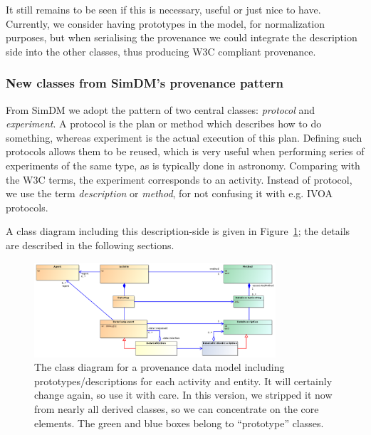 It still remains to be seen if this is necessary, useful or just nice to have. Currently, we consider having prototypes in the model, for normalization purposes, but when serialising the provenance we could integrate the description side into the other classes, thus producing W3C compliant provenance.



\subsubsection{New classes from SimDM's provenance pattern}
From SimDM we adopt the pattern of two central classes: \emph{protocol} and \emph{experiment}.  A protocol is the plan or method
which describes how to do something, whereas experiment is the actual execution of
this plan. Defining such protocols allows them to be reused, which is very useful when performing series of experiments of the same type, as is typically done in astronomy. Comparing with the W3C terms, the experiment corresponds to an activity. Instead of protocol, we use the term \emph{description} or \emph{method}, 
for not confusing it with e.g. IVOA protocols.

A class diagram including this description-side %
is given in Figure~\ref{fig:classes-prototypes}; the details are described in the following sections.

\begin{figure}
\centering
\includegraphics[width=0.8\textwidth]{ProvDM-classdiagram-prototypes.png}
\caption{The class diagram for a provenance data model including prototypes/descriptions for each activity and entity. It will certainly change again, so use it with care. In this version, we stripped it now from nearly all derived classes, so we can concentrate on the core elements. The green and blue boxes belong to ``prototype'' classes.}
\label{fig:classes-prototypes}
\end{figure}


